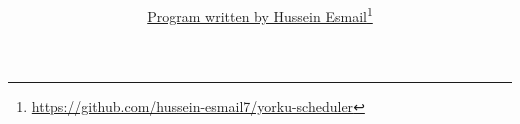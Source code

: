 



\def\myAuthor			{\href{https://github.com/hussein-esmail7/yorku-scheduler}{Program written by Hussein Esmail}\footnote{\href{https://github.com/hussein-esmail7/yorku-scheduler}{https://github.com/hussein-esmail7/yorku-scheduler}}}
\def\mySubject			{PDF Subject Here}  %
\def\myKeywords			{PDF Keywords Here} %
\def\myTitle			{[TITLE]}

\def\bg{backgroundcolor}
\def\len{\setlength}
\newcommand{\image}[1]{[\textbf{IMAGE MISSING #1}]} %
\newenvironment{itemize*}{\begin{itemize}\setlength{\itemsep}{0pt}\setlength{\parskip}{0pt}}{\end{itemize}}
\newenvironment{enumerate*}{\begin{enumerate}\setlength{\itemsep}{0pt}\setlength{\parskip}{0pt}}{\end{enumerate}}
\newenvironment{enumalph*}{\begin{enumerate}[label=\alph*.]\setlength{\itemsep}{0pt}\setlength{\parskip}{0pt}}{\end{enumerate}}
\newenvironment{enumq*}{\begin{enumerate}[label=Q{{\arabic*}}.]\setlength{\itemsep}{0pt}\setlength{\parskip}{0pt}}{\end{enumerate}}
\newcommand{\TODO}[1]{\todo[backgroundcolor=none, linecolor=red]{#1}}
\newcommand{\TODOimg}[1]{\todo[inline, \bg=gray]{\textbf{IMG}: #1}}
\newcommand{\TODOcontent}[1]{\todo[\bg=red, linecolor=red]{\textbf{CON}: #1}}
\newcommand{\TODOfig}[1]{\todo[inline, \bg=orange]{\textbf{FIG}: #1}}

\documentclass{article}
\title{\vspace{-3cm} \\ \myTitle}
\author{\myAuthor}
\date{ }

